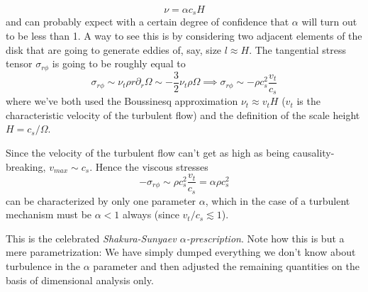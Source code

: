 \begin{equation}
    \nu = \alpha c_{s}H 
    \label{eq:alpha_presc}
\end{equation}
and can probably expect with a certain degree of confidence that $\alpha$ will turn out to be less than 1. A way to see this is by considering two adjacent elements of the disk that are going to generate eddies of, say, size $l\approx H$. The tangential stress tensor $\sigma_{r\phi}$ is going to be roughly equal to 
\begin{equation*}
    \sigma_{r\phi} \sim \nu_{t}\rho r\partial_{r}\Omega \sim -\frac{3}{2}\nu_{t}\rho\Omega \implies  \sigma_{r\phi} \sim -\rho c^{2}_{s}\frac{v_{t}}{c_{s}}
\end{equation*}
where we've both used the Boussinesq approximation $\nu_{t} \approx v_{t}H$ ($v_{t}$ is the characteristic velocity of the turbulent flow) and the definition of the scale height $H = c_{s}/\Omega$.
\par Since the velocity of the turbulent flow can't get as high as being causality-breaking, $v_{max}\sim c_{s}$. Hence the viscous stresses
\begin{equation*}
   -\sigma_{r\phi}\sim \rho c^{2}_{s}\frac{v_{t}}{c_{s}} = \alpha\rho c^{2}_{s}
\end{equation*}
can be characterized by only one parameter $\alpha$, which in the case of a turbulent mechanism must be $\alpha < 1$ always (since $v_{t}/c_{s}\lesssim 1$).
\par This is the celebrated \emph{Shakura-Sunyaev $\alpha$-prescription}. Note how this is but a mere parametrization: We have simply dumped everything we don't know about turbulence in the $\alpha$ parameter and then adjusted the remaining quantities on the basis of dimensional analysis only.
